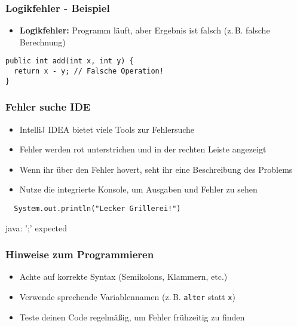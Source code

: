 \documentclass{../../presentation}
\begin{document}
\begin{frame}[fragile]
  \frametitle{Logikfehler - Beispiel}
  \begin{itemize}
    \item \textbf{Logikfehler:} Programm läuft, aber Ergebnis ist falsch (z.\,B. falsche Berechnung)
  \end{itemize}
  \begin{verbatim}
public int add(int x, int y) {
  return x - y; // Falsche Operation!
}
  \end{verbatim}
\end{frame}

\begin{frame}[fragile]
  \frametitle{Fehler suche IDE}
  \pause
  \begin{itemize}
    \item IntelliJ IDEA bietet viele Tools zur Fehlersuche
          \pause
    \item Fehler werden rot unterstrichen und in der rechten Leiste angezeigt
          \pause
    \item Wenn ihr über den Fehler hovert, seht ihr eine Beschreibung des Problems
          \pause
    \item Nutze die integrierte Konsole, um Ausgaben und Fehler zu sehen \newline
  \end{itemize}
  \begin{verbatim}
  System.out.println("Lecker Grillerei!")
  \end{verbatim}
  \pause
  \begin{ausgabe}
    \color{red}java: ';' expected
  \end{ausgabe}
\end{frame}

\begin{frame}[fragile]
  \frametitle{Hinweise zum Programmieren}
  \pause
  \begin{itemize}
    \item Achte auf korrekte Syntax (Semikolons, Klammern, etc.)
          \pause
    \item Verwende sprechende Variablennamen (z.\,B. \texttt{alter} statt \texttt{x})
          \pause
    \item Teste deinen Code regelmäßig, um Fehler frühzeitig zu finden
  \end{itemize}
\end{frame}
\end{document}
